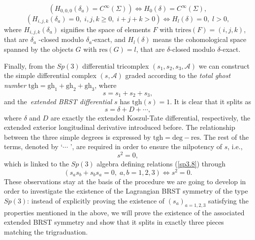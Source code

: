 \documentclass[a4paper,12pt]{article}
\begin{document}
\begin{equation}
\left( H_{0,0,0}\left( \delta _{a}\right) =C^{\infty }\left( \Sigma \right)
\right) \Leftrightarrow H_{0}\left( \delta \right) =C^{\infty }\left( \Sigma
\right) ,  \label{sp3.i}
\end{equation}
\begin{equation}
\left( H_{i,j,k}\left( \delta _{a}\right) =0,\;i,j,k\geq 0,\;i+j+k>0\right)
\Leftrightarrow H_{l}\left( \delta \right) =0,\;l>0,  \label{sp3.i1}
\end{equation}
where $H_{i,j,k}\left( \delta _{a}\right) $ signifies the space of elements $%
F$ with $\mathrm{trires}\left( F\right) =(i,j,k)$, that are $\delta _{a}$%
-closed modulo $\delta _{a}$-exact, and $H_{l}\left( \delta \right) $ means
the cohomological space spanned by the objects $G$ with $\mathrm{res}(G)=l$,
that are $\delta $-closed modulo $\delta $-exact.

Finally, from the $Sp(3)$ differential tricomplex $\left( s_{1},s_{2},s_{3},%
\mathcal{A}\right) $ we can construct the simple differential complex $%
\left( s,\mathcal{A}\right) $ graded according to the \textit{total ghost
number} $\mathrm{tgh}=\mathrm{gh}_{1}+\mathrm{gh}_{2}+\mathrm{gh}_{3}$,
where 
\begin{equation}
s=s_{1}+s_{2}+s_{3},  \label{sp3.j}
\end{equation}
and the\textit{\ extended BRST differential} $s$ has $\mathrm{tgh}\left(
s\right) =1$. It is clear that it splits as 
\begin{equation}
s=\delta +D+\cdots ,  \label{sp3.k}
\end{equation}
where $\delta $ and $D$ are exactly the extended Koszul-Tate differential,
respectively, the extended exterior longitudinal derivative introduced
before. The relationship between the three simple degrees is expressed by $%
\mathrm{tgh=deg}-\mathrm{res}$. The rest of the terms, denoted by `$\cdots $%
', are required in order to ensure the nilpotency of $s$, i.e., 
\begin{equation}
s^{2}=0,  \label{sp3.l}
\end{equation}
which is linked to the $Sp(3)$ algebra defining relations (\ref{sp3.8})
through 
\begin{equation}
\left( s_{a}s_{b}+s_{b}s_{a}=0,\;a,b=1,2,3\right) \Leftrightarrow s^{2}=0.
\label{sp3.m}
\end{equation}
These observations stay at the basis of the procedure we are going to
develop in order to investigate the existence of the Lagrangian BRST
symmetry of the type $Sp(3)$: instead of explicitly proving the existence of 
$\left( s_{a}\right) _{a=1,2,3}$ satisfying the properties mentioned in the
above, we will prove the existence of the associated extended BRST symmetry
and show that it splits in exactly three pieces matching the trigraduation.
\end{document}
